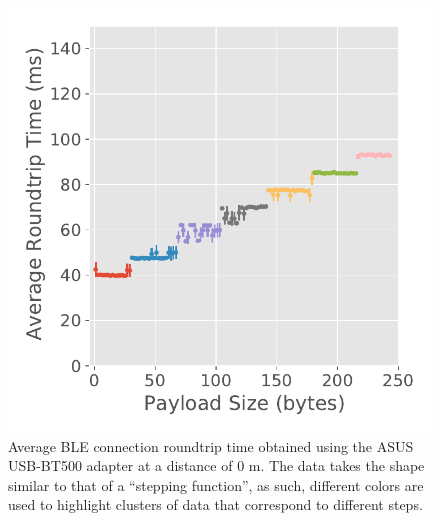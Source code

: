 \begin{figure}[H]
    \centering
    \begin{minipage}{0.45\linewidth}
        \centering
        \includegraphics[width=\linewidth]{images/ble-roundtrip-hci0-0cm.pdf}
        \caption[Average \acs{BLE} connection roundtrip time obtained using the ASUS USB-BT500 adapter at a distance of 0 m.]{Average \acs{BLE} connection roundtrip time obtained using the ASUS USB-BT500 adapter at a distance of $0\text{ m}$. The data takes the shape similar to that of a ``stepping function'', as such, different colors are used to highlight clusters of data that correspond to different steps.}
        \label{fig:ble-roundtrip-hci0-0m}
    \end{minipage}
    \hspace{0.05\linewidth}
    \begin{minipage}{0.45\linewidth}
        \centering

\end{minipage}
\end{figure}
